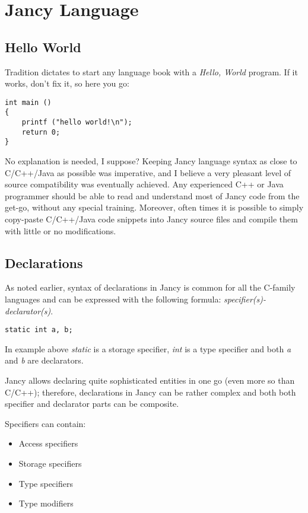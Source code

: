 \documentclass[oneside]{book}
\begin{document}
\chapter{Jancy Language}

\section{Hello World}

Tradition dictates to start any language book with a \emph{Hello, World} program. If it works, don't fix it, so here you go:

\begin{lstlisting}
int main ()
{
    printf ("hello world!\n");
    return 0;
}
\end{lstlisting}

No explanation is needed, I suppose? Keeping Jancy language syntax as close to C/C++/Java as possible was imperative, and I believe a very pleasant level of source compatibility was eventually achieved. Any experienced C++ or Java programmer should be able to read and understand most of Jancy code from the get-go, without any special training. Moreover, often times it is possible to simply copy-paste C/C++/Java code snippets into Jancy source files and compile them with little or no modifications.

\section{Declarations}

As noted earlier, syntax of declarations in Jancy is common for all the C-family languages and can be expressed with the following formula: \emph{specifier(s)-declarator(s)}. 

\begin{lstlisting}
static int a, b;
\end{lstlisting}

In example above \emph{static} is a storage specifier, \emph{int} is a type specifier and both \emph{a} and \emph{b} are declarators.

Jancy allows declaring quite sophisticated entities in one go (even more so than C/C++); therefore, declarations in Jancy can be rather complex and both both specifier and declarator parts can be composite. 

Specifiers can contain:
\begin{itemize}
\item Access specifiers
\item Storage specifiers
\item Type specifiers
\item Type modifiers
\end{itemize}
\end{document}
